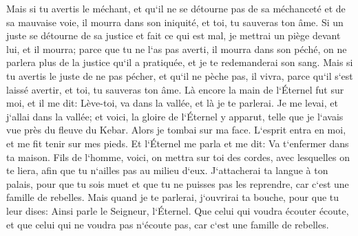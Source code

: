 \verse Mais si tu avertis le méchant, et qu`il ne se détourne pas de sa méchanceté et de sa mauvaise voie, il mourra dans son iniquité, et toi, tu sauveras ton âme. 
\verse Si un juste se détourne de sa justice et fait ce qui est mal, je mettrai un piège devant lui, et il mourra; parce que tu ne l`as pas averti, il mourra dans son péché, on ne parlera plus de la justice qu`il a pratiquée, et je te redemanderai son sang. 
\verse Mais si tu avertis le juste de ne pas pécher, et qu`il ne pèche pas, il vivra, parce qu`il s`est laissé avertir, et toi, tu sauveras ton âme. 
\verse Là encore la main de l`Éternel fut sur moi, et il me dit: Lève-toi, va dans la vallée, et là je te parlerai. 
\verse Je me levai, et j`allai dans la vallée; et voici, la gloire de l`Éternel y apparut, telle que je l`avais vue près du fleuve du Kebar. Alors je tombai sur ma face. 
\verse L`esprit entra en moi, et me fit tenir sur mes pieds. Et l`Éternel me parla et me dit: Va t`enfermer dans ta maison. 
\verse Fils de l`homme, voici, on mettra sur toi des cordes, avec lesquelles on te liera, afin que tu n`ailles pas au milieu d`eux. 
\verse J`attacherai ta langue à ton palais, pour que tu sois muet et que tu ne puisses pas les reprendre, car c`est une famille de rebelles. 
\verse Mais quand je te parlerai, j`ouvrirai ta bouche, pour que tu leur dises: Ainsi parle le Seigneur, l`Éternel. Que celui qui voudra écouter écoute, et que celui qui ne voudra pas n`écoute pas, car c`est une famille de rebelles. 

